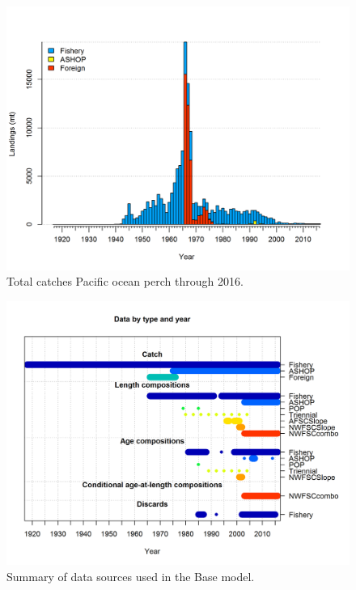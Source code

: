 \documentclass[12pt,]{article}
\begin{document}
\begin{figure}
\centering
\includegraphics{r4ss/plots_mod1/catch2 landings stacked.png}
\caption{Total catches Pacific ocean perch through 2016.
\label{fig:Catch}}
\end{figure}

\FloatBarrier

\begin{figure}
\centering
\includegraphics{r4ss/plots_mod1/data_plot.png}
\caption{Summary of data sources used in the Base model.
\label{fig:data_plot}}
\end{figure}

\FloatBarrier
\end{document}
